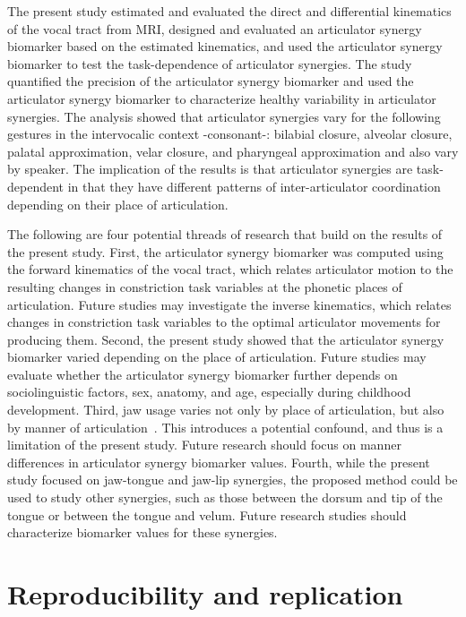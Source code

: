 \documentclass[reprint]{JASAnew}\usepackage[]{graphicx}\usepackage[]{color}
\begin{document}
The present study estimated and evaluated the direct and differential kinematics of the vocal tract from MRI, 
%
designed and evaluated an articulator synergy biomarker based on the estimated kinematics, and
%
used the articulator synergy biomarker to test the task-dependence of articulator synergies.
%
The study quantified the precision of the articulator synergy biomarker and used the articulator synergy biomarker to characterize healthy variability in articulator synergies. 
%
The analysis showed that articulator synergies vary for the following gestures in the intervocalic context \textipa{[a]}-consonant-\textipa{[a]}: bilabial closure, alveolar closure, palatal approximation, velar closure, and pharyngeal approximation and also vary by speaker. 
%
The implication of the results is that articulator synergies are task-dependent in that they have different patterns of inter-articulator coordination depending on their place of articulation. 



The following are four potential threads of research that build on the results of the present study.
%
First, the articulator synergy biomarker was computed using the forward kinematics of the vocal tract, which relates articulator motion to the resulting changes in constriction task variables at the phonetic places of articulation. Future studies may investigate the inverse kinematics, which relates changes in constriction task variables to the optimal articulator movements for producing them. 
%
Second, the present study showed that the articulator synergy biomarker varied depending on the place of articulation. Future studies may evaluate whether the articulator synergy biomarker further depends on sociolinguistic factors, sex, anatomy, and age, especially during childhood development.
%
Third, jaw usage varies not only by place of articulation, but also by manner of articulation~\cite{vatikiotis1995analysis}. This introduces a potential confound, and thus is a limitation of the present study. Future research should focus on manner differences in articulator synergy biomarker values.
%
Fourth, while the present study focused on jaw-tongue and jaw-lip synergies, the proposed method could be used to study other synergies, such as those between the dorsum and tip of the tongue or between the tongue and velum. Future research studies should characterize biomarker values for these synergies.

\section{Reproducibility and replication}
\end{document}
